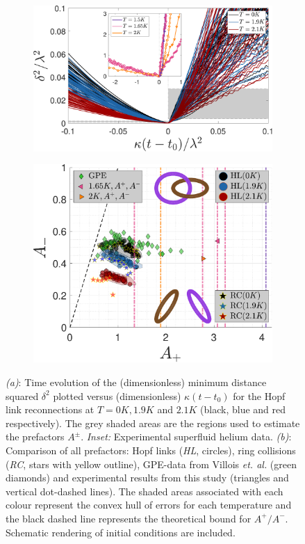 \documentclass[9pt,twocolumn,twoside]{pnas-new}
\begin{document}
\begin{figure}[t]
	\centering
	\begin{subfigure}[b]{0.45\textwidth}
		\centering
		\includegraphics*[width=\textwidth]{min-delta-with-exp.pdf}
		\caption{}
		\label{fig:minimum-distance}
	\end{subfigure}
	\begin{subfigure}[b]{0.45\textwidth}
		\centering
		\includegraphics*[width=\textwidth]{prefactors-with-exp.pdf}
		\caption{}
		\label{fig:prefactors}
	\end{subfigure}
\caption{\emph{(a)}: Time evolution of the (dimensionless)
minimum distance squared $\delta^2$ plotted versus (dimensionless) $\kappa (t-t_0)$ for
the Hopf link reconnections at $T=0K,1.9K$ and $2.1K$ (black, blue and red
respectively). The grey shaded areas
are the regions used to estimate the prefactors $A^{\pm}$. 
\emph{Inset:} Experimental superfluid helium data.
\emph{(b)}: Comparison of all prefactors: Hopf links (\emph{HL}, circles), 
ring collisions (\emph{RC}, stars with yellow outline), GPE-data 
from Villois \emph{et. al.} \cite{villoisIrreversibleDynamicsVortex2020} (green diamonds) and experimental results from this study (triangles and vertical dot-dashed lines). 
The shaded areas associated with each colour represent the convex hull of errors 
for each temperature and the black dashed line represents the theoretical bound for $A^+/A^-$. Schematic rendering of initial conditions are included.}
\end{figure}
\end{document}
